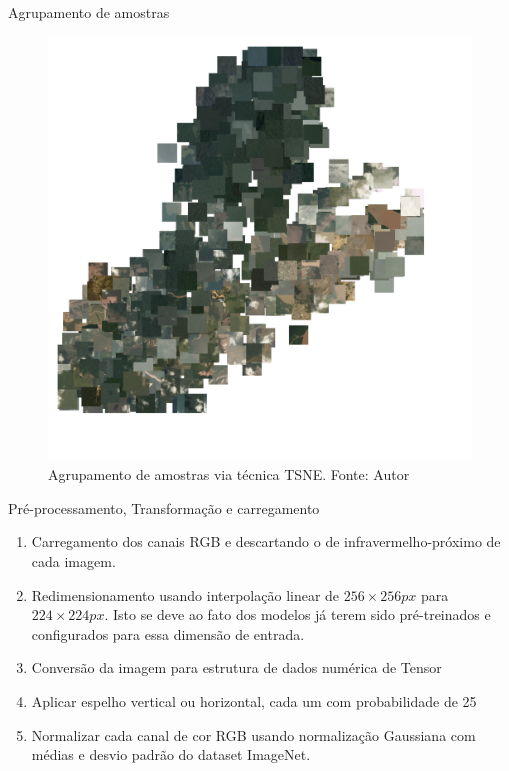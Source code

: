 \documentclass[8pt]{beamer}
\begin{document}
\begin{frame}{Agrupamento de amostras}
    \begin{figure}[!ht]
        \centering
        \includegraphics[width=0.7\columnwidth]{Imagens/results/rsp-resnet-50_planet_pt/TSNE Clustering.pdf}
        \caption{Agrupamento de amostras via técnica TSNE.
        Fonte: Autor}
       \label{fig:TSNE}
    \end{figure}    
\end{frame}

\begin{frame}{Pré-processamento, Transformação e carregamento}
    \begin{enumerate}
        \item   Carregamento dos canais RGB e descartando o de infravermelho-próximo de cada imagem.
        \item   Redimensionamento usando interpolação linear de $256 \times 256px$ para $224 \times 224px$. Isto se deve ao fato dos modelos já terem sido pré-treinados e configurados para essa dimensão de entrada.
        \item   Conversão da imagem para estrutura de dados numérica de Tensor
        \item   Aplicar espelho vertical ou horizontal, cada um com probabilidade de 25%
        \item   Normalizar cada canal de cor RGB usando normalização Gaussiana com médias e desvio padrão do dataset ImageNet.
    \end{enumerate}    
\end{frame}
\end{document}
